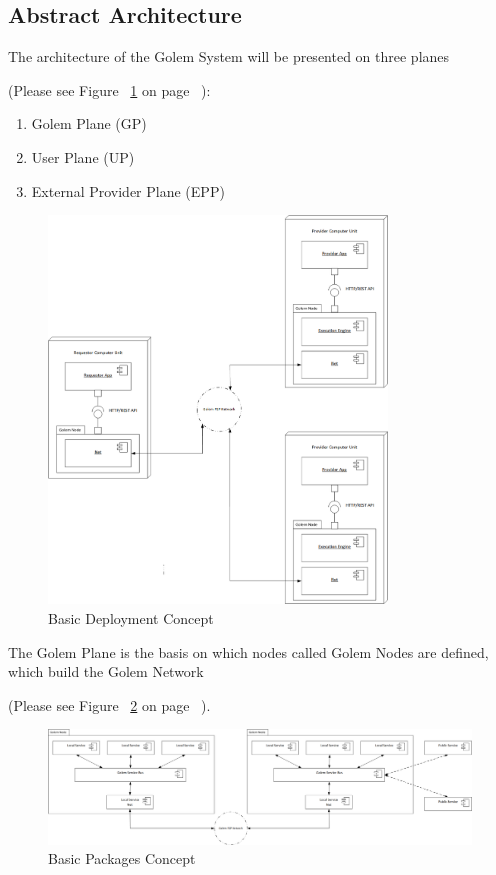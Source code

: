 \newpage

\subsection{Abstract Architecture}

The architecture of the Golem System will be presented on three planes 

(Please see Figure ~\ref{fig:BDC} on page ~\pageref{fig:BDC}):

\begin{enumerate}
	\item Golem Plane (GP)
	\item User Plane (UP)
	\item External Provider Plane (EPP)
\end{enumerate}

\begin{figure}[H]
    \centering
    \includegraphics[width=9cm,angle=0]{./diag/Abstract/BasicDeployment-Abstract.png}
    \caption{Basic Deployment Concept}
	\label{fig:BDC}
\end{figure}

The Golem Plane is the basis on which nodes called Golem Nodes are defined, which build the Golem Network 

(Please see Figure ~\ref{fig:BPC} on page ~\pageref{fig:BPC}).

\begin{figure}[H]
    \centering
    \includegraphics[width=18cm,angle=0]{./diag/Abstract/BasicPackages-Abstract.png}
	\caption{Basic Packages Concept}
    \label{fig:BPC}
\end{figure}

